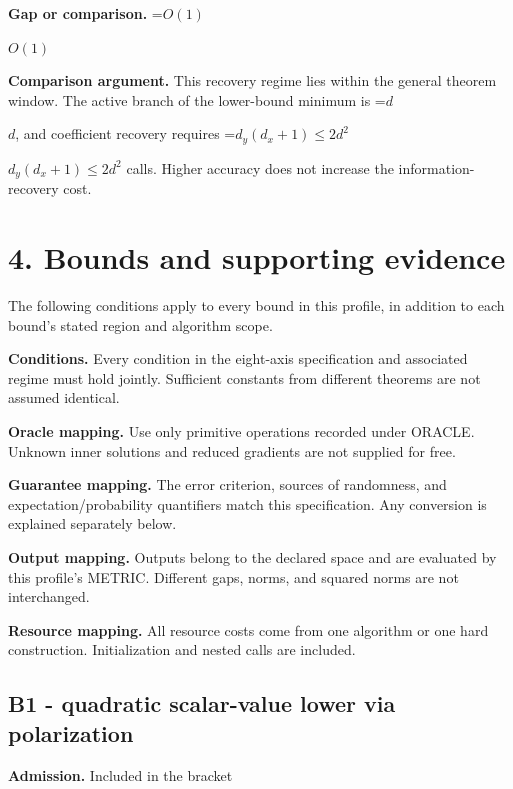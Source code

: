 \documentclass[10pt,a4paper]{article}
\newcommand{\AtlasMath}[1]{\par\begingroup\centering\setbox0=\hbox{$\displaystyle #1$}\ifdim\wd0>1.4\linewidth\typeout{ATLAS WIDE FORMULA: \the\wd0}\fi\ifdim\wd0>\linewidth\resizebox{\linewidth}{!}{\box0}\else\box0\fi\par\endgroup}
\newcommand{\AtlasInlineMath}[1]{\begingroup\setbox0=\hbox{$#1$}\ifdim\wd0>.4\linewidth\endgroup\AtlasMath{#1}\else\endgroup$#1$\fi}
\begin{document}
\textbf{Gap or comparison.} \AtlasInlineMath{O(1)}



\textbf{Comparison argument.} This recovery regime lies within the general theorem window. The active branch of the lower-bound minimum is \AtlasInlineMath{d}, and coefficient recovery requires \AtlasInlineMath{d_y(d_x+1)\le2d^2} calls. Higher accuracy does not increase the information-recovery cost.



\section{4. Bounds and supporting evidence}


The following conditions apply to every bound in this profile, in addition to each bound's stated region and algorithm scope.



\textbf{Conditions.} Every condition in the eight-axis specification and associated regime must hold jointly. Sufficient constants from different theorems are not assumed identical.



\textbf{Oracle mapping.} Use only primitive operations recorded under ORACLE. Unknown inner solutions and reduced gradients are not supplied for free.



\textbf{Guarantee mapping.} The error criterion, sources of randomness, and expectation/probability quantifiers match this specification. Any conversion is explained separately below.



\textbf{Output mapping.} Outputs belong to the declared space and are evaluated by this profile's METRIC. Different gaps, norms, and squared norms are not interchanged.



\textbf{Resource mapping.} All resource costs come from one algorithm or one hard construction. Initialization and nested calls are included.



\subsection{B1 - quadratic scalar-value lower via polarization}


\textbf{Admission.} Included in the bracket
\end{document}
